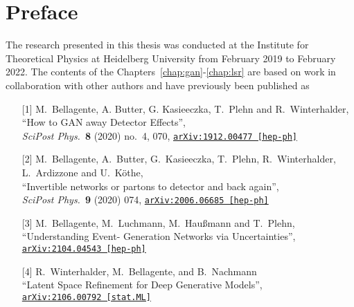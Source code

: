 %
%
%

\chapter*{Preface}

The research presented in this thesis was conducted at the Institute 
for Theoretical Physics at Heidelberg University from February 2019 to
February 2022. 
The contents of the Chapters~\ref{chap:gan}-\ref{chap:lsr}
are based on work in collaboration with other authors and have previously 
been published as~%
%
\begin{itemize}
	\item[{[1]}] M.~Bellagente, A. Butter, G. Kasieeczka, T.~Plehn and R.~Winterhalder,\\
			``How to GAN away Detector Effects'',\\
			\textit{SciPost Phys.}~\textbf{8} (2020) no.~4, 070, 
			\href{https://arxiv.org/abs/1912.00477}{\texttt{arXiv:1912.00477 [hep-ph]}}
	\item[{[2]}] M.~Bellagente, A.~Butter, G.~Kasieeczka, T.~Plehn, R.~Winterhalder, L.~Ardizzone and U.~Köthe,\\
			``Invertible networks or partons to detector and back again'',\\
			\textit{SciPost Phys.}~\textbf{9} (2020) 074, 
			\href{https://arxiv.org/abs/2006.06685}{\texttt{arXiv:2006.06685 [hep-ph]}}
	\item[{[3]}] M.~Bellagente,  M.~Luchmann, M.~Haußmann and T.~Plehn,\\
			``Understanding Event- Generation Networks via Uncertainties'',\\
			\href{https://arxiv.org/pdf/2104.04543.pdf}{\texttt{arXiv:2104.04543 [hep-ph]}}
	\item[{[4]}] R.~Winterhalder,  M.~Bellagente, and B.~Nachmann\\
			``Latent Space Refinement for Deep Generative Models'',\\
			\href{https://arxiv.org/pdf/2106.00792.pdf}{\texttt{arXiv:2106.00792 [stat.ML]}}
			
\end{itemize}
%



%
